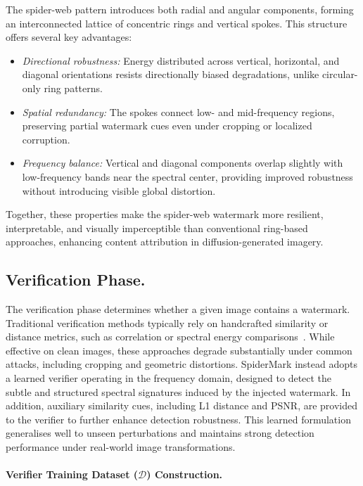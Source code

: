 \documentclass[lettersize,journal,review]{IEEEtran}
\begin{document}
The spider-web pattern introduces both radial and angular components, forming an interconnected lattice of concentric rings and vertical spokes. This structure offers several key advantages:
\begin{itemize}
    \item \textit{Directional robustness:} Energy distributed across vertical, horizontal, and diagonal orientations resists directionally biased degradations, unlike circular-only ring patterns.
    \item \textit{Spatial redundancy:} The spokes connect low- and mid-frequency regions, preserving partial watermark cues even under cropping or localized corruption.
    \item \textit{Frequency balance:} Vertical and diagonal components overlap slightly with low-frequency bands near the spectral center, providing improved robustness without introducing visible global distortion.
\end{itemize}
Together, these properties make the spider-web watermark more resilient, interpretable, and visually imperceptible than conventional ring-based approaches, enhancing content attribution in diffusion-generated imagery.

\subsection{Verification Phase.}

The verification phase determines whether a given image contains a watermark. Traditional verification methods typically rely on handcrafted similarity or distance metrics, such as correlation or spectral energy comparisons~\cite{Potdar2005watermarksurvey, wen2023tree_ring, yang2024gaussian}. While effective on clean images, these approaches degrade substantially under common attacks, including cropping and geometric distortions. SpiderMark instead adopts a learned verifier operating in the frequency domain, designed to detect the subtle and structured spectral signatures induced by the injected watermark. In addition, auxiliary similarity cues, including L1 distance and PSNR, are provided to the verifier to further enhance detection robustness. This learned formulation generalises well to unseen perturbations and maintains strong detection performance under real-world image transformations.


\paragraph{Verifier Training Dataset ($\mathcal{D}$) Construction.}
\end{document}
